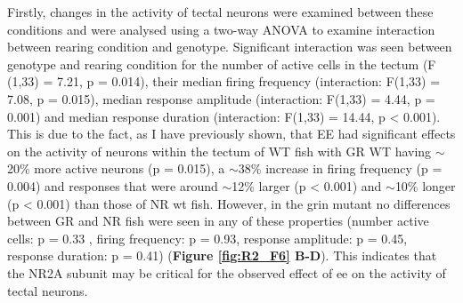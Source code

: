 Firstly, changes in the activity of tectal neurons were examined between these conditions and were analysed using a two-way ANOVA to examine interaction between rearing condition and genotype. Significant interaction was seen between genotype and rearing condition for the number of active cells in the tectum (F (1,33) = 7.21, p = 0.014), their median firing frequency (interaction: F(1,33) = 7.08, p = 0.015), median response amplitude (interaction: F(1,33) = 4.44, p = 0.001) and median response duration (interaction: F(1,33) = 14.44, p < 0.001). This is due to the fact, as I have previously shown, that EE had significant effects on the activity of neurons within the tectum of WT fish with GR WT having $\sim$20\% more active neurons (p = 0.015), a $\sim$38\% increase in firing frequency (p = 0.004) and responses that were around  $\sim$12\%  larger (p < 0.001) and $\sim$10\% longer (p < 0.001) than those of NR \gls{wt} fish.  However, in the \gls{grin} mutant no differences between GR and NR fish were seen in any of these properties (number active cells: p = 0.33 , firing frequency:  p = 0.93, response amplitude: p = 0.45, response duration: p = 0.41) (\textbf{Figure \ref{fig:R2_F6} B-D}). This indicates that the NR2A subunit may be critical for the observed effect of \gls{ee} on the activity of tectal neurons. 

